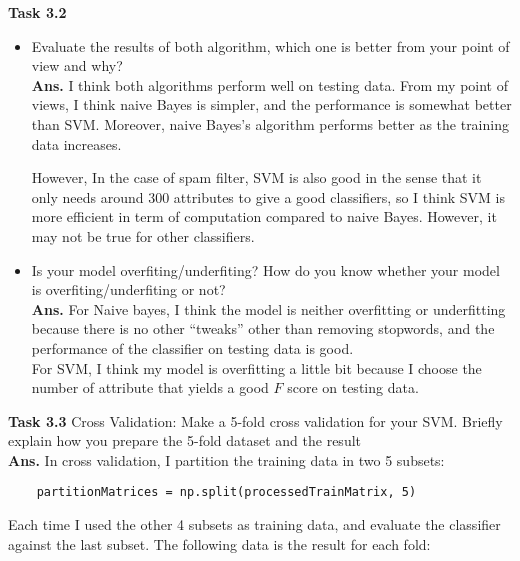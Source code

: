 \documentclass{article}
\begin{document}
\noindent\textbf{Task 3.2}
\begin{itemize}
	\item Evaluate the results of both algorithm, which one is better from your point of view and why?\\
	\textbf{Ans. }
	I think both algorithms perform well on testing data. From my point of views, I think naive Bayes is simpler, and the performance is somewhat better than SVM. Moreover, naive Bayes's algorithm performs better as the training data increases. 

	However, In the case of spam filter, SVM is also good in the sense that it only needs around 300 attributes to give a good classifiers, so I think SVM is more efficient in term of computation compared to naive Bayes. However, it may not be true for other classifiers.

	\item  Is your model overfiting/underfiting?  How do you know whether your model is overfiting/underfiting or not?
	\\
	\textbf{Ans. }
	For Naive bayes, I think the model is neither overfitting or underfitting because there is no other ``tweaks'' other than removing stopwords, and the performance of the classifier on testing data is good.
	\\
	For SVM, I think my model is overfitting a little bit because I choose the number of attribute that yields a good $F$ score on testing data. 
\end{itemize}
\noindent \textbf{Task 3.3}
Cross Validation: Make a 5-fold cross validation for your SVM. Briefly explain how you prepare the
5-fold dataset and the result\\
\textbf{Ans.} In cross validation, I partition the training data in two 5 subsets:
\begin{verbatim}
	partitionMatrices = np.split(processedTrainMatrix, 5)
\end{verbatim}
Each time I used the other 4 subsets as training data, and evaluate the classifier against the last subset. The following data is the result for each fold:
\end{document}
